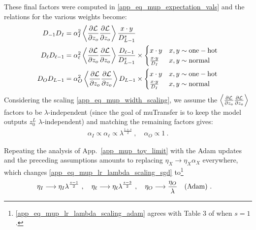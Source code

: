 \documentclass[11pt]{article}
\begin{document}
These final factors were computed in \eqref{app_eq_mup_expectation_vals} and the relations for the
various weights become:
\begin{align}
    D_{ -1 }D_{ I } &=\alpha_{ I }^{ 2 } \left\langle \frac{ \partial \mathcal{L} }{ \partial z_{ o } }\frac{\partial \mathcal{L} }{ \partial z_{ o } }\right\rangle \frac{ x \cdot y }{ D^{ s }_{ L-1 } }\nonumber\\
    D_{ \ell }D_{ \ell-1 } &=\alpha_{ \ell }^{ 2 } \left\langle \frac{ \partial \mathcal{L} }{ \partial z_{ o } }\frac{\partial \mathcal{L} }{ \partial z_{ o } }\right\rangle \frac{ D_{ \ell-1 } }{ D_{ L-1 }^{ s } } \times \begin{cases} x\cdot y & x, y \sim {\rm one-hot}\\ \frac{ x\cdot y }{ D_{ I } } & x, y \sim {\rm normal}\end{cases}\nonumber\\
    D_{ O }D_{ L-1 } &=\alpha_{O}^{ 2 } \left\langle \frac{ \partial \mathcal{L} }{ \partial z_{ o } }\frac{\partial \mathcal{L} }{ \partial z_{ o } } \right\rangle D_{ L-1} \times \begin{cases} x\cdot y & x, y \sim {\rm one-hot}\\ \frac{ x\cdot y }{ D_{ I } } & x, y \sim {\rm normal}\end{cases}\nonumber\\
\end{align}
Considering the scaling \eqref{app_eq_mup_width_scaling}, we assume the $ \left\langle \frac{
\partial \mathcal{L} }{ \partial z_{ o } }\frac{\partial \mathcal{L} }{ \partial z_{ o } } \right\rangle $
factors to be $ \lambda $-independent (since the goal of muTransfer is to keep the model outputs $
z^{ L }_{ 0 } $ $ \lambda $-independent) and matching the remaining factors gives:
\begin{align}
  \alpha_{ I }\propto \alpha_{ \ell }\propto \lambda^{ \frac{ 1+s }{ 2 } } \ , \quad
  \alpha_{ O }\propto 1 \ .
\end{align}

Repeating the analysis of App.~\ref{app_mup_toy_limit} with the Adam updates and the preceding
assumptions amounts to replacing $ \eta_{ X }\longrightarrow \eta_{ X }\alpha_{ X } $ everywhere,
which changes \eqref{app_eq_mup_lr_lambda_scaling_sgd}
to\footnote{\eqref{app_eq_mup_lr_lambda_scaling_adam} agrees with  Table 3 of \cite{yang2022tensor}
when $ s=1 $.}
\begin{align}
    \eta_{ I } &\longrightarrow \eta_{ I }  \lambda^{ \frac{ s-1 }{ 2 } }\ ,\quad
    \eta_{ \ell } \longrightarrow \eta_{ \ell } \lambda^{ \frac{ s-3 }{ 2 } }\ , \quad
    \eta_{ O } \longrightarrow\frac{ \eta_{ O } }{ \lambda } \quad \label{app_eq_mup_lr_lambda_scaling_adam} ({\rm Adam}) \ .
\end{align}
\end{document}
